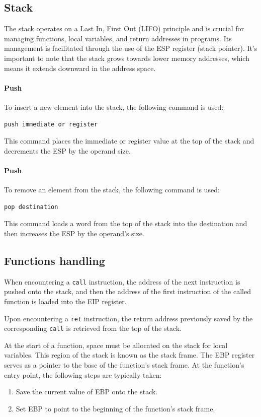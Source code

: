 \subsection{Stack}
The stack operates on a Last In, First Out (LIFO) principle and is crucial for managing functions, local variables, and return addresses in programs. 
Its management is facilitated through the use of the ESP register (stack pointer). 
It's important to note that the stack grows towards lower memory addresses, which means it extends downward in the address space.

\paragraph*{Push}
To insert a new element into the stack, the following command is used:
\begin{verbatim}
push immediate or register
\end{verbatim}
This command places the immediate or register value at the top of the stack and decrements the ESP by the operand size.

\paragraph*{Push}
To remove an element from the stack, the following command is used:
\begin{verbatim}
pop destination   
\end{verbatim}
This command loads a word from the top of the stack into the destination and then increases the ESP by the operand's size.

\subsection{Functions handling}
When encountering a \texttt{call} instruction, the address of the next instruction is pushed onto the stack, and then the address of the first instruction of the called function is loaded into the EIP register.

Upon encountering a \texttt{ret} instruction, the return address previously saved by the corresponding \texttt{call} is retrieved from the top of the stack.

At the start of a function, space must be allocated on the stack for local variables. 
This region of the stack is known as the stack frame. 
The EBP register serves as a pointer to the base of the function's stack frame. 
At the function's entry point, the following steps are typically taken:
\begin{enumerate}
    \item Save the current value of EBP onto the stack.
    \item Set EBP to point to the beginning of the function's stack frame.
\end{enumerate}

